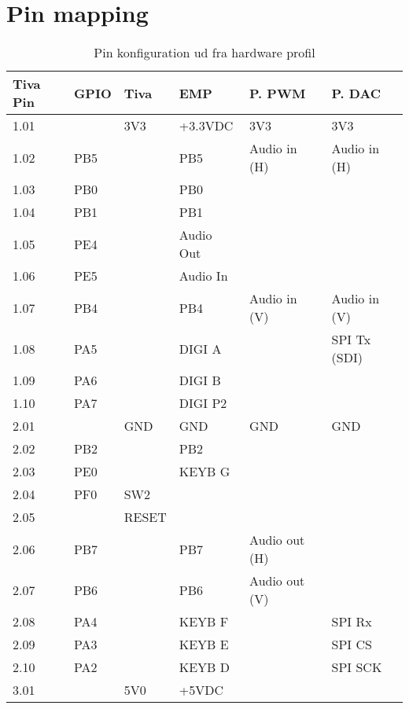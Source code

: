 \chapter{Pin mapping} \label{bilag:pinmap}

\begin{table}[h!]
	\caption{Pin konfiguration ud fra hardware profil}
	\label{tab:pin_mapping}
	\begin{threeparttable}
		\begin{tabular}{l l l l l l}
			\toprule
			\textbf{Tiva Pin\tnote{a}} 	& 
			\textbf{GPIO\tnote{b}}  	&
			\textbf{Tiva\tnote{c}} 		& 
			\textbf{EMP\tnote{d}}  		&
			\textbf{P. PWM\tnote{e}} 	&
			\textbf{P. DAC\tnote{g}}	\\ 
			\midrule
			1.01 &      & 3V3  	& +3.3VDC		& 3V3			&  3V3  		\\
			1.02 &  PB5 &      	& PB5\tnote{g}	& Audio in (H) 	& Audio in (H)	\\
			1.03 &	PB0 &	   	& PB0			&				&				\\
			1.04 &	PB1 &      	& PB1			&				&				\\
			1.05 &	PE4 &	   	& Audio Out\tnote{g}&			&				\\
			1.06 &	PE5 &	   	& Audio In		&				&				\\
			1.07 &	PB4 &	   	& PB4			& Audio in (V)	& Audio in (V)	\\
			1.08 &	PA5 &	   	& DIGI A		& 				& SPI Tx (SDI)	\\
			1.09 &	PA6 &	   	& DIGI B    	& 				&				\\
			1.10 &	PA7 &	   	& DIGI P2		& 				&				\\
			\midrule
			2.01 &     	& GND  	& GND  			&  GND 			& GND			\\
			2.02 & PB2 	&      	& PB2\tnote{g}	&				&				\\
			2.03 & PE0 	&	  	& KEYB G 		&				&				\\
			2.04 & PF0 	& SW2	& 				&				&				\\
			2.05 &     	& RESET	& 				&				&				\\
			2.06 & PB7	&		& PB7			& Audio out (H)	&				\\
			2.07 & PB6	&		& PB6			& Audio out (V)	&				\\
			2.08 & PA4 	&      	& KEYB F 		&				& SPI Rx		\\
			2.09 & PA3 	&		& KEYB E    	& 				& SPI CS		\\
			2.10 & PA2  &		& KEYB D		& 				& SPI SCK		\\
			\midrule
			3.01 &		& 5V0	& +5VDC			&				&				\\

\end{tabular}
\end{threeparttable}
\end{table}
